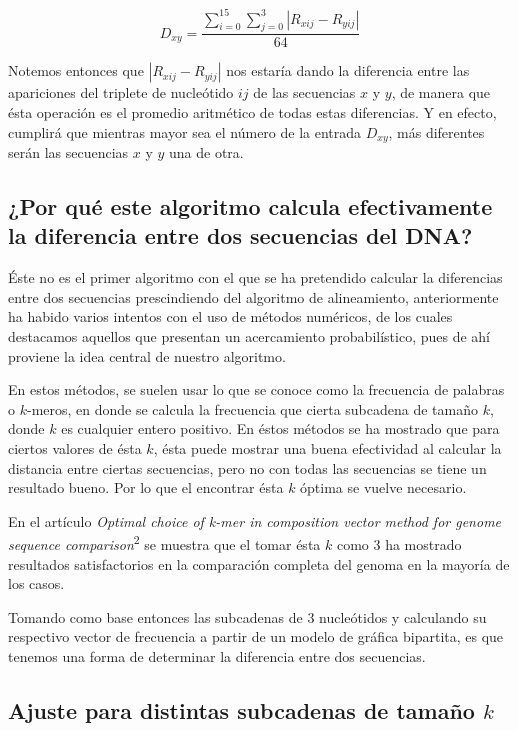 \documentclass[12pt]{article}
\begin{document}
\[D_{xy}=\frac{\sum_{i=0}^{15}\sum_{j=0}^{3}\left\vert R_{xij}-R_{yij}\right\vert}{64}\]

Notemos entonces que $\left\vert R_{xij}-R_{yij}\right\vert$ nos estaría dando la diferencia entre las apariciones del triplete de nucleótido $ij$ de las secuencias $x$ y $y$, de manera que ésta operación es el promedio aritmético de todas estas diferencias. Y en efecto, cumplirá que mientras mayor sea el número de la entrada $D_{xy}$, más diferentes serán las secuencias $x$ y $y$ una de otra.

\subsection{¿Por qué este algoritmo calcula efectivamente la diferencia entre dos secuencias del DNA?}

\noindent Éste no es el primer algoritmo con el que se ha pretendido calcular la diferencias entre dos secuencias prescindiendo del algoritmo de alineamiento, anteriormente ha habido varios intentos con el uso de métodos numéricos, de los cuales destacamos aquellos que presentan un acercamiento probabilístico, pues de ahí proviene la idea central de nuestro algoritmo.

En estos métodos, se suelen usar lo que se conoce como la frecuencia de palabras o $k$-meros, en donde se calcula la frecuencia que cierta subcadena de tamaño $k$, donde $k$ es cualquier entero positivo. En éstos métodos se ha mostrado que para ciertos valores de ésta $k$, ésta puede mostrar una buena efectividad al calcular la distancia entre ciertas secuencias, pero no con todas las secuencias se tiene un resultado bueno. Por lo que el encontrar ésta $k$ óptima se vuelve necesario.

En el artículo \textit{Optimal choice of k-mer in composition vector method for genome sequence comparison}\textsuperscript{2} se muestra que el tomar ésta $k$ como $3$ ha mostrado resultados satisfactorios en la comparación completa del genoma en la mayoría de los casos.

Tomando como base entonces las subcadenas de 3 nucleótidos y calculando su respectivo vector de frecuencia a partir de un modelo de gráfica bipartita, es que tenemos una forma de determinar la diferencia entre dos secuencias.

\subsection{Ajuste para distintas subcadenas de tamaño $k$}
\end{document}
